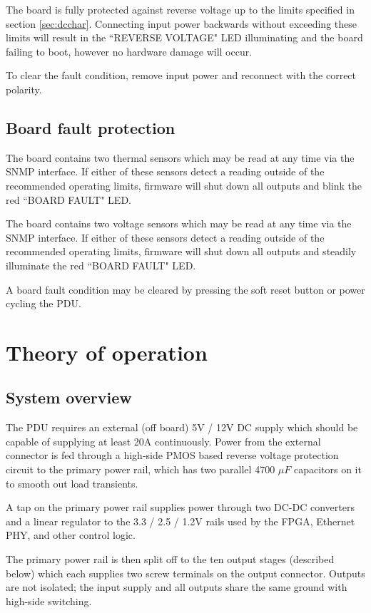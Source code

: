 \documentclass{article}
\begin{document}
The board is fully protected against reverse voltage up to the limits specified in section \ref{sec:dcchar}. 
Connecting input power backwards without exceeding these limits will result in the ``REVERSE VOLTAGE" LED 
illuminating and the board failing to boot, however no hardware damage will occur.

To clear the fault condition, remove input power and reconnect with the correct polarity.

\subsection{Board fault protection}

The board contains two thermal sensors which may be read at any time via the SNMP interface. If either of these 
sensors detect a reading outside of the recommended operating limits, firmware will shut down all outputs and blink 
the red ``BOARD FAULT" LED.

The board contains two voltage sensors which may be read at any time via the SNMP interface. If either of these 
sensors detect a reading outside of the recommended operating limits, firmware will shut down all outputs and 
steadily illuminate the red ``BOARD FAULT" LED.

A board fault condition may be cleared by pressing the soft reset button or power cycling the PDU.

\pagebreak
\section{Theory of operation}

\subsection{System overview}

The PDU requires an external (off board) 5V / 12V DC supply which should be capable of supplying at least 20A 
continuously. Power from the external connector is fed through a high-side PMOS based reverse voltage protection 
circuit to the primary power rail, which has two parallel 4700 $\mu F$ capacitors on it to smooth out load transients.

A tap on the primary power rail supplies power through two DC-DC converters and a linear regulator to the 3.3 / 2.5 / 
1.2V rails used by the FPGA, Ethernet PHY, and other control logic.

The primary power rail is then split off to the ten output stages (described below) which each supplies two screw 
terminals on the output connector. Outputs are not isolated; the input supply and all outputs share the same ground 
with high-side switching.
\end{document}
